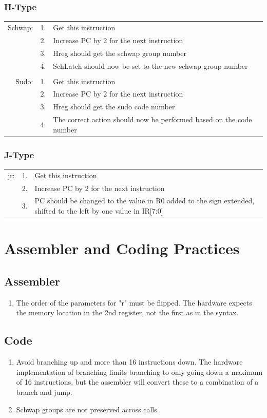 \documentclass{article}
\begin{document}
		\subsubsection{H-Type}
			\begin{tabular}{ r  r  p{12cm} }
					Schwap: & 1. & Get this instruction\\
					        & 2. & Increase PC by 2 for the next instruction\\
					        & 3. & Hreg should get the schwap group number\\
					        & 4. & SchLatch should now be set to the new schwap group number\\
					        &    & \\
					Sudo:   & 1. & Get this instruction\\
					        & 2. & Increase PC by 2 for the next instruction\\
					        & 3. & Hreg should get the sudo code number\\
					        & 4. & The correct action should now be performed based on the code number\\
			\end{tabular}
		\subsubsection{J-Type}
			\begin{tabular}{ r  r  p{12cm} }
					jr: & 1. & Get this instruction\\
					    & 2. & Increase PC by 2 for the next instruction\\
					    & 3. & PC should be changed to the value in R0 added to the sign extended, shifted to the left by one value in IR[7:0]\\
			\end{tabular}
\section{Assembler and Coding Practices}
	\subsection{Assembler}
		\begin{enumerate}
			\item The order of the parameters for "r" must be flipped.  The hardware expects the memory location in the 2nd register, not the first as in the syntax.
		\end{enumerate}
	\subsection{Code}
		\begin{enumerate}
			\item Avoid branching up and more than 16 instructions down.  The hardware implementation of branching limits branching to only going down a maximum of 16 instructions, but the assembler will convert these to a combination of a branch and jump.
			\item Schwap groups are not preserved across calls.
		\end{enumerate}
\end{document}
